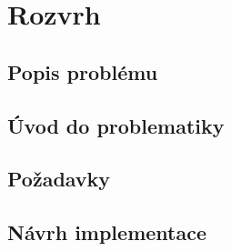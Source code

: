\chapter{Rozvrh}
\section{Popis problému}
\section{Úvod do problematiky}
\section{Požadavky}
\section{Návrh implementace}

